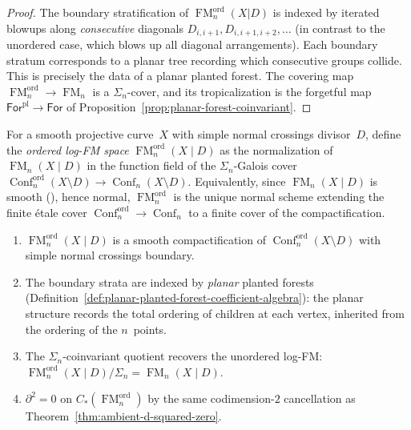 \begin{proof}
The boundary stratification of
$\operatorname{FM}_n^{\mathrm{ord}}(X|D)$ is indexed by
iterated blowups along \emph{consecutive} diagonals
$D_{i,i+1}, D_{i,i+1,i+2}, \ldots$ (in contrast to the unordered
case, which blows up all diagonal arrangements).  Each boundary
stratum corresponds to a planar tree recording which consecutive
groups collide.  This is precisely the data of a planar planted
forest.  The covering map
$\operatorname{FM}_n^{\mathrm{ord}} \to \operatorname{FM}_n$ is a
$\Sigma_n$-cover, and its tropicalization is the forgetful map
$\mathsf{For}^{\mathrm{pl}} \to \mathsf{For}$ of
Proposition~\ref{prop:planar-forest-coinvariant}.
\end{proof}

\begin{proposition}
\label{prop:ordered-log-fm-construction}
\ClaimStatusProvedHere
{}
For a smooth projective curve~$X$ with simple normal crossings
divisor~$D$, define the \emph{ordered log-FM space}
$\operatorname{FM}_n^{\mathrm{ord}}(X \mathbin{|} D)$
as the normalization of
$\operatorname{FM}_n(X \mathbin{|} D)$
in the function field of the $\Sigma_n$-Galois
cover $\operatorname{Conf}_n^{\mathrm{ord}}(X \setminus D)
\to \operatorname{Conf}_n(X \setminus D)$.
Equivalently, since $\operatorname{FM}_n(X \mathbin{|} D)$
is smooth \textup{(}\cite[Theorem~3.3.1(1)]{Mok25}\textup{)},
hence normal,
$\operatorname{FM}_n^{\mathrm{ord}}$ is the unique normal
scheme extending the finite \'etale cover
$\operatorname{Conf}_n^{\mathrm{ord}} \to
\operatorname{Conf}_n$ to a finite cover of the
compactification.
\begin{enumerate}[label=\textup{(\roman*)}]
\item $\operatorname{FM}_n^{\mathrm{ord}}(X \mathbin{|} D)$
  is a smooth compactification of
  $\operatorname{Conf}_n^{\mathrm{ord}}(X \setminus D)$
  with simple normal crossings boundary.
\item The boundary strata are indexed by
  \emph{planar} planted forests
  \textup{(}Definition~\textup{\ref{def:planar-planted-forest-coefficient-algebra}}\textup{)}:
  the planar structure records the total ordering of children
  at each vertex, inherited from the ordering of the $n$~points.
\item The $\Sigma_n$-coinvariant quotient recovers the
  unordered log-FM:
  $\operatorname{FM}_n^{\mathrm{ord}}(X \mathbin{|} D)
  / \Sigma_n
  = \operatorname{FM}_n(X \mathbin{|} D)$.
\item $\partial^2 = 0$ on
  $C_*(\operatorname{FM}_n^{\mathrm{ord}})$
  by the same codimension-$2$ cancellation as
  Theorem~\textup{\ref{thm:ambient-d-squared-zero}}.
\end{enumerate}
\end{proposition}

